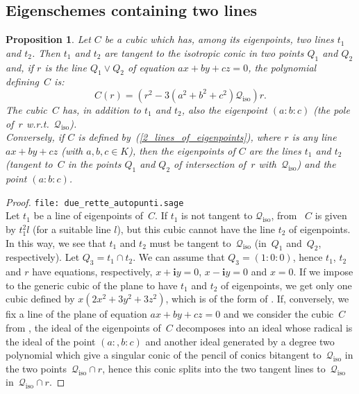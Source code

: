 \documentclass{amsart}
\theoremstyle{plain}
\newtheorem{prop}[lemma]{Proposition}
\theoremstyle{definition}
\newcommand{\iso}{\mathcal{Q}_{\mathrm{iso}}}
\newcommand{\iii}{\textbf{i}}
\begin{document}
\subsection{Eigenschemes containing two lines}
\begin{prop}
\label{cubiche_con_2_rette}
Let $C$ be a cubic which has, among its eigenpoints, two lines $t_1$
and $t_2$. Then $t_1$ and $t_2$ are tangent to the isotropic conic
in two points $Q_1$ and $Q_2$ and, if $r$ is the line $Q_1 \vee Q_2$
of equation $ax+by+cz=0$, the polynomial defining~$C$ is:
%
\begin{equation}
C(r) = \left(r^2-3\left(a^2+b^2+c^2\right)\iso\right)r.
\label{2_lines_of_eigenpoints}
\end{equation}
%
The cubic~$C$ has, in addition to $t_1$ and $t_2$, also the eigenpoint $(a: b: c)$
(the pole of~$r$ w.r.t.\ $\iso$). \\
Conversely, if $C$ is defined by~(\ref{2_lines_of_eigenpoints}), where
$r$ is any line $ax+by+cz$ (with $a, b, c \in K$), then
the eigenpoints of $C$ are the lines $t_1$ and $t_2$ (tangent to~$C$
in the points $Q_1$ and $Q_2$ of intersection of~$r$ with~$\iso$) and
the point $(a: b: c)$.
\end{prop}
\begin{proof}
\verb+file: due_rette_autopunti.sage+\\
Let $t_1$ be a line of eigenpoints of~$C$. If $t_1$ is not tangent
to $\iso$, from~ $C$ is given by $t_1^2l$ (for
a suitable line $l$), but this cubic cannot have the line $t_2$
of eigenpoints.
In this way, we see that $t_1$ and $t_2$ must be tangent to~$\iso$ (in~$Q_1$ and~$Q_2$, respectively). Let $Q_3 = t_1 \cap t_2$. We can assume
that $Q_3 = (1: 0: 0)$, hence $t_1$, $t_2$ and $r$ have equations,
respectively, $x+\iii y=0$, $x-\iii y = 0$ and $x=0$.
If we impose to the generic cubic of the plane to have
$t_1$ and $t_2$ of eigenpoints, we get only one cubic defined by
$x(2x^2 + 3y^2 + 3z^2)$, which is of the
form of . If, conversely, we fix a line
of the plane of equation $ax+by+cz=0$ and we consider the cubic~$C$ from , the ideal of
the eigenpoints of~$C$ decomposes into an ideal whose radical is
the ideal of the point $(a:, b: c)$ and another ideal generated by
a degree two polynomial which give a singular conic of the pencil
of conics bitangent to~$\iso$ in the two points~$\iso \cap r$, hence
this conic splits into the two tangent lines to~$\iso$ in~$\iso \cap r$.
\end{proof}
\end{document}
